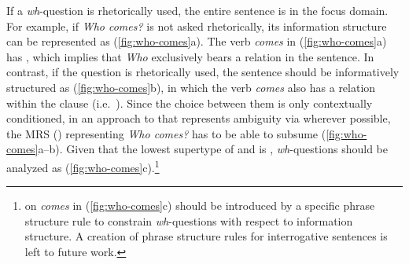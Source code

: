 If a \textit{wh}-question is rhetorically used, the entire sentence is
in the focus domain. For example, if \textit{Who comes?} is not asked
rhetorically, its information structure can be represented as
(\ref{fig:who-comes}a). The verb \textit{comes} in
(\ref{fig:who-comes}a) has , which implies that \textit{Who}
exclusively bears a  relation in the sentence. In contrast, if
the question is rhetorically used, the sentence should be
informatively structured as (\ref{fig:who-comes}b), in which the verb
\textit{comes} also has a  relation within the clause
(i.e.\ ). Since the choice between them is only
contextually conditioned, in an approach to 
that represents ambiguity via  wherever possible,
the MRS (\citealt{copestake:etal:05}) representing \textit{Who comes?} has
to be able to subsume (\ref{fig:who-comes}a--b). Given that the
lowest supertype of  and  is ,
\textit{wh}-questions should be analyzed as
(\ref{fig:who-comes}c).\footnote{ on \textit{comes} in
  (\ref{fig:who-comes}c) should be introduced by a specific phrase
  structure rule to constrain \textit{wh}-questions with respect to
  information structure.  A creation of phrase structure rules for
  interrogative sentences is left to future work.}








